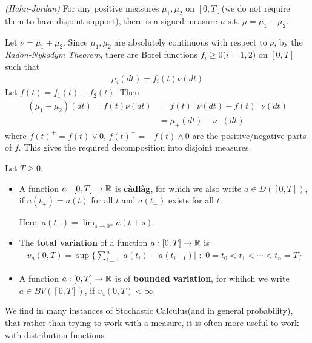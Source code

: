 \documentclass[12pt,a4paper]{article}
\newenvironment{proof}
{\begin{changemargin}{0.5cm}{0.5cm} 
	}%
	{\end{changemargin}
}
\renewenvironment{i}
{\begin{itemize} 
	}%
	{\end{itemize}
}
\newenvironment{p}
{\begin{proof} 
	}%
	{\end{proof}
}
\begin{document}
\prop \emph{(Hahn-Jordan)} For any positive measures $\mu_1, \mu_2$ on $[0, T]$(we do not require them to have disjoint support), there is a signed measure $\mu$ s.t. $\mu = \mu_1 - \mu_2$.
\begin{p}
\pf Let $\nu = \mu_1 + \mu_2$. Since $\mu_1,\mu_2$ are absolutely continuous with respect to $\nu$, by the \emph{Radon-Nykodym Theorem}, there are Borel functions $f_i \geq 0$($i= 1,2$) on $[0, T]$ such that 
\begin{align*}
\mu_i (dt) = f_i(t) \nu(dt)
\end{align*}
Let $f(t) = f_1(t)  - f_2(t)$. Then
\begin{align*}
(\mu_1 - \mu_2) (dt) = f(t) \nu (dt) & = f(t)^+ \nu(dt) - f(t)^- \nu(dt) \\
& = \mu_+(dt) - \nu_-(dt)
\end{align*}
where $f(t)^+ = f(t) \vee 0$, $f(t)^- = -f(t) \wedge 0$ are the positive/negative parts of $f$. This gives the required decomposition into disjoint measures.

\eop 
\end{p}
\s

 Let $T \geq 0$.
\begin{i}
\item A function $a: [0, T] \rightarrow \mathbb{R}$ is \textbf{c\`{a}dl\`{a}g}, for which we also write $a\in D([0, T])$, if $a(t_+)  = a(t)$ for all $t$ and $a(t_-)$ exists for all $t$.

\quad Here, $a(t_{\pm}) = \lim_{s\rightarrow 0^{\pm}} a(t+s)$.
\item The \textbf{total variation} of a function $a:[0, T] \rightarrow \mathbb{R}$ is
\begin{align*}
v_a(0, T) = \sup \Big\{ \sum_{i=1}^n |a(t_i) - a(t_{i-1})|\,\, : \,\, 0 = t_0<t_1<\cdots<t_n=T \Big\}
\end{align*}
\item A function $a:[0, T] \rightarrow \mathbb{R}$ is of \textbf{bounded variation}, for whihch we write $a\in BV([0,T])$, if $v_a(0,T) < \infty$. 
\end{i}
\s

We find in many instances of Stochastic Calculus(and in general probability), that rather than trying to work with a measure, it is often more useful to work with distribution functions.
\s
\end{document}
